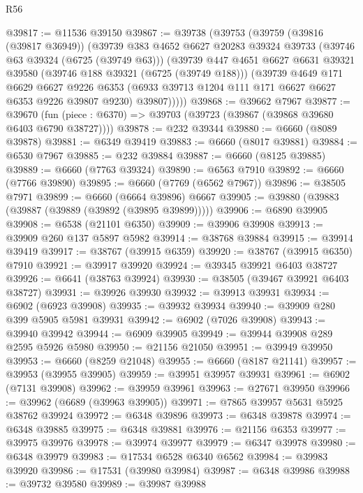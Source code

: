 \begin{lexlean}{R56}
\begin{coremodule}
@39817 := @11536 @39150
@39867 := @39738
    (@39753
      (@39759
        (@39816 (@39817 @36949))
        (@39739
          @383
          @4652
          @6627
          @20283
          @39324
          @39733
          (@39746 @63 @39324 (@6725 (@39749 @63)))
          (@39739
            @447
            @4651
            @6627
            @6631
            @39321
            @39580
            (@39746 @188 @39321 (@6725 (@39749 @188)))
            (@39739
              @4649
              @171
              @6629
              @6627
              @9226
              @6353
              (@6933 @39713 @1204 @111 @171 @6627 @6627 @6353 @9226 @39807 @9230)
              @39807)))))
@39868 := @39662 @7967
@39877 := @39670
    (fun (piece : @6370) => @39703 (@39723 (@39867 (@39868 @39680 @6403 @6790 @38727))))
@39878 := @232 @39344
@39880 := @6660 (@8089 @39878)
@39881 := @6349 @39419
@39883 := @6660 (@8017 @39881)
@39884 := @6530 @7967
@39885 := @232 @39884
@39887 := @6660 (@8125 @39885)
@39889 := @6660 (@7763 @39324)
@39890 := @6563 @7910
@39892 := @6660 (@7766 @39890)
@39895 := @6660 (@7769 (@6562 @7967))
@39896 := @38505 @7971
@39899 := @6660 (@6664 @39896) @6667
@39905 := @39880 (@39883 (@39887 (@39889 (@39892 (@39895 @39899)))))
@39906 := @6890 @39905
@39908 := @6538 (@21101 @6350)
@39909 := @39906 @39908
@39913 := @39909 @260 @137 @5897 @5982
@39914 := @38768 @39884
@39915 := @39914 @39419
@39917 := @38767 (@39915 @6359)
@39920 := @38767 (@39915 @6350) @7910
@39921 := @39917 @39920
@39924 := @39345 @39921 @6403 @38727
@39926 := @6641 (@38763 @39924)
@39930 := @38505 (@39467 @39921 @6403 @38727)
@39931 := @39926 @39930
@39932 := @39913 @39931
@39934 := @6902 (@6923 @39908)
@39935 := @39932 @39934
@39940 := @39909 @280 @399 @5905 @5981 @39931
@39942 := @6902 (@7026 @39908)
@39943 := @39940 @39942
@39944 := @6909 @39905
@39949 := @39944 @39908 @289 @2595 @5926 @5980
@39950 := @21156 @21050
@39951 := @39949 @39950
@39953 := @6660 (@8259 @21048)
@39955 := @6660 (@8187 @21141)
@39957 := @39953 (@39955 @39905)
@39959 := @39951 @39957 @39931
@39961 := @6902 (@7131 @39908)
@39962 := @39959 @39961
@39963 := @27671 @39950
@39966 := @39962 (@6689 (@39963 @39905))
@39971 := @7865 @39957 @5631 @5925 @38762 @39924
@39972 := @6348 @39896
@39973 := @6348 @39878
@39974 := @6348 @39885
@39975 := @6348 @39881
@39976 := @21156 @6353
@39977 := @39975 @39976
@39978 := @39974 @39977
@39979 := @6347 @39978
@39980 := @6348 @39979
@39983 := @17534 @6528 @6340 @6562
@39984 := @39983 @39920
@39986 := @17531 (@39980 @39984)
@39987 := @6348 @39986
@39988 := @39732 @39580
@39989 := @39987 @39988

\end{coremodule}
\end{lexlean}
